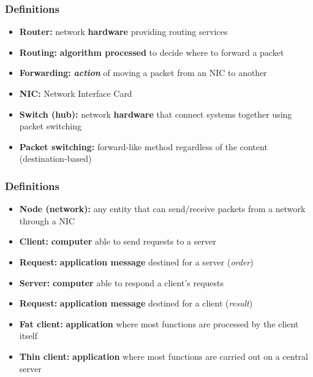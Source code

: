   \begin{frame}
    \frametitle{Definitions}
      \begin{itemize}
        \item \textbf{Router:} network \textbf{hardware} providing routing services\pause
        \item \textbf{Routing:} \textbf{algorithm processed} to decide where to forward a packet\pause
        \item \textbf{Forwarding:} \textbf{\emph{action}} of moving a packet from an NIC to another\pause
        \item \textbf{NIC:} Network Interface Card
        \item \textbf{Switch (hub):} network \textbf{hardware} that connect systems together using packet switching\pause
        \item \textbf{Packet switching:} forward-like method regardless of the content (destination-based)
      \end{itemize}
  \end{frame}
  \begin{frame}
    \frametitle{Definitions}
      \begin{itemize}
        \item \textbf{Node (network):} any entity that can send/receive packets from a network through a NIC\pause
        \item \textbf{Client:} \textbf{computer} able to send requests to a server\pause
        \item \textbf{Request:} \textbf{application message} destined for a server (\emph{order})\pause
        \item \textbf{Server:} \textbf{computer} able to respond a client's requests\pause
        \item \textbf{Request:} \textbf{application message} destined for a client (\emph{result})\pause
        \item \textbf{Fat client:} \textbf{application} where most functions are processed by the client itself\pause
        \item \textbf{Thin client:} \textbf{application} where most functions are carried out on a central server
      \end{itemize}
  \end{frame}

